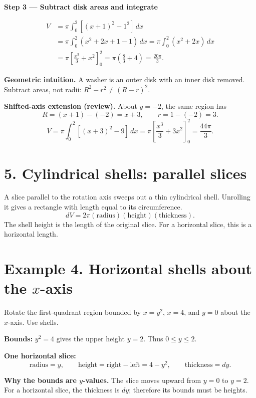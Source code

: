 \documentclass[11pt,letterpaper]{article}
\newcommand{\topic}[1]{\section*{#1}}
\newcommand{\intuition}[1]{\par\textbf{Geometric intuition.} #1\par}
\newcommand{\step}[2]{\par\textbf{Step #1 --- #2}\par}
\begin{document}
\step{3}{Subtract disk areas and integrate}
\begin{align*}
V&=\pi\int_0^2[(x+1)^2-1^2]\,dx\\
 &=\pi\int_0^2(x^2+2x+1-1)\,dx
 =\pi\int_0^2(x^2+2x)\,dx\\
 &=\pi\left[\frac{x^3}{3}+x^2\right]_0^2
 =\pi\left(\frac83+4\right)=\boxed{\frac{20\pi}{3}}.
\end{align*}
\intuition{A washer is an outer disk with an inner disk removed. Subtract areas, not radii: $R^2-r^2\neq(R-r)^2$.}
\textbf{Shifted-axis extension (review).} About $y=-2$, the same region has
\[R=(x+1)-(-2)=x+3,\qquad r=1-(-2)=3.\]
\[
V=\pi\int_0^2[(x+3)^2-9]\,dx
=\pi\left[\frac{x^3}{3}+3x^2\right]_0^2
=\boxed{\frac{44\pi}{3}}.
\]
\newpage
\topic{5. Cylindrical shells: parallel slices}
A slice parallel to the rotation axis sweeps out a thin cylindrical shell. Unrolling it gives a rectangle with length equal to its circumference.
\[
\boxed{dV=2\pi(\text{radius})(\text{height})(\text{thickness})}.
\]
The shell height is the length of the original slice. For a horizontal slice, this is a horizontal length.
\topic{Example 4. Horizontal shells about the $x$-axis}
Rotate the first-quadrant region bounded by $x=y^2$, $x=4$, and $y=0$ about the $x$-axis. Use shells.

\textbf{Bounds:} $y^2=4$ gives the upper height $y=2$. Thus $0\leq y\leq2$.

\textbf{One horizontal slice:}
\[
\text{radius}=y,\qquad
\text{height}=\text{right}-\text{left}=4-y^2,\qquad
\text{thickness}=dy.
\]
\begin{center}\end{center}
\textbf{Why the bounds are $y$-values.} The slice moves upward from $y=0$ to $y=2$. For a horizontal slice, the thickness is $dy$; therefore its bounds must be heights.
\end{document}
